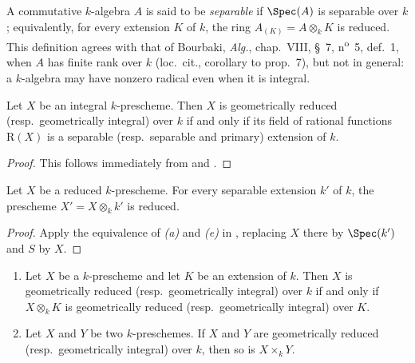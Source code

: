 A commutative $k$-algebra $A$ is said to be \emph{separable} if
$\Spec(A)$ is separable over $k$; equivalently, for every extension
$K$ of $k$, the ring $A_{(K)}=A\otimes_k K$ is reduced.
This definition agrees with that of Bourbaki, \emph{Alg.}, chap.~VIII,
\S~7, n\textsuperscript{o}~5, def.~1, when $A$ has finite rank over
$k$ (loc.\ cit., corollary to prop.~7), but not in general: a
$k$-algebra may have nonzero radical even when it is integral.

\begin{corollary}[4.6.3]
\label{IV.4.6.3}
Let $X$ be an integral $k$-prescheme.
Then $X$ is geometrically reduced (resp.\ geometrically integral) over
$k$ if and only if its field of rational functions $\mathrm{R}(X)$ is
a separable (resp.\ separable and primary) extension of $k$.
\end{corollary}

\begin{proof}
This follows immediately from  and
.
\end{proof}

\begin{corollary}[4.6.4]
\label{IV.4.6.4}
Let $X$ be a reduced $k$-prescheme.
For every separable extension $k'$ of $k$, the prescheme
$X'=X\otimes_k k'$ is reduced.
\end{corollary}

\begin{proof}
Apply the equivalence of \emph{(a)} and \emph{(e)} in
, replacing $X$ there by $\Spec(k')$ and $S$ by $X$.
\end{proof}

\begin{proposition}[4.6.5]
\label{IV.4.6.5}
\begin{enumerate}
\item[\rm(i)]
\label{IV.4.6.5.i}
Let $X$ be a $k$-prescheme and let $K$ be an extension of $k$.
Then $X$ is geometrically reduced (resp.\ geometrically integral) over
$k$ if and only if $X\otimes_k K$ is geometrically reduced
(resp.\ geometrically integral) over $K$.

\item[\rm(ii)]
\label{IV.4.6.5.ii}
Let $X$ and $Y$ be two $k$-preschemes.
If $X$ and $Y$ are geometrically reduced
(resp.\ geometrically integral) over $k$, then so is $X\times_k Y$.
\end{enumerate}
\end{proposition}

